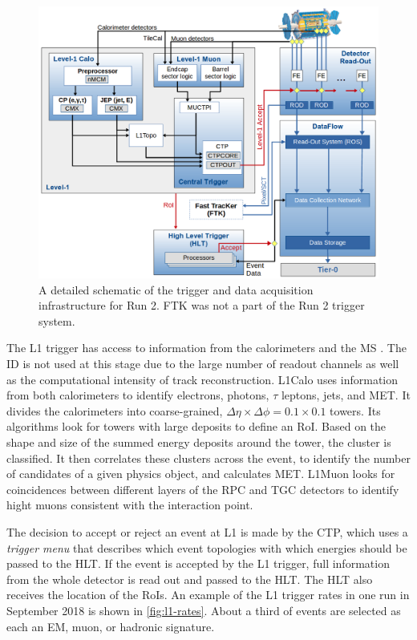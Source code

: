 \begin{figure}[!h]
\centering
\includegraphics[width=.6\textwidth]{figures/Detector/tdaq-schematic.png}
\caption{A detailed schematic of the trigger and data acquisition infrastructure for Run 2. FTK was not a part of the Run 2 trigger system. \cite{TRIG-2016-01}}
\label{fig:tdaq-schematic}
\end{figure}


The \ac{L1} trigger has access to information from the calorimeters and the \ac{MS} \cite{TRIG-2016-01}. The \ac{ID} is not used at this stage due to the large number of readout channels as well as the computational intensity of track reconstruction. \ac{L1Calo} uses information from both calorimeters to identify electrons, photons, $\tau$ leptons, jets, and \ac{MET}. It divides the calorimeters into coarse-grained, $\Delta \eta \times \Delta \phi = 0.1 \times 0.1$ towers. Its algorithms look for towers with large deposits to define an \ac{RoI}. Based on the shape and size of the summed energy deposits around the tower, the cluster is classified. It then correlates these clusters across the event, to identify the number of candidates of a given physics object, and calculates \ac{MET}. \ac{L1Muon} looks for coincidences between different layers of the \ac{RPC} and \ac{TGC} detectors to identify hight \pt muons consistent with the interaction point. 

The decision to accept or reject an event at \ac{L1} is made by the \ac{CTP}, which uses a \emph{trigger menu} that describes which event topologies with which energies should be passed to the \ac{HLT}. If the event is accepted by the \ac{L1} trigger, full information from the whole detector is read out and passed to the \ac{HLT}. The \ac{HLT} also receives the location of the \acp{RoI}. An example of the \ac{L1} trigger rates in one run in September 2018 is shown in \autoref{fig:l1-rates}. About a third of events are selected as each an \ac{EM}, muon, or hadronic signature.

